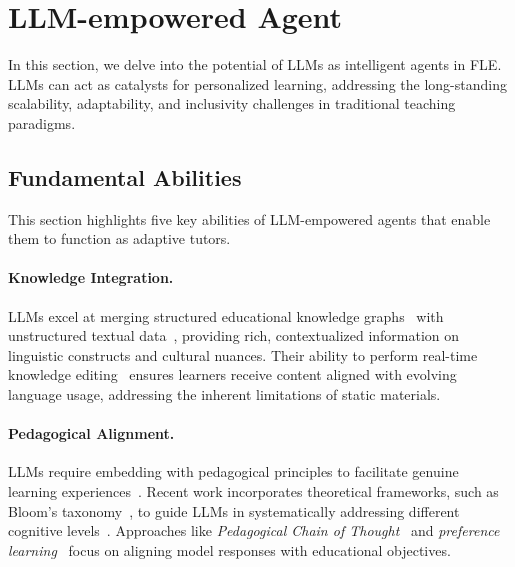 \section{LLM-empowered Agent}\label{sec:agent}
In this section, we delve into the potential of LLMs as intelligent agents in FLE. LLMs can act as catalysts for personalized learning, addressing the long-standing scalability, adaptability, and inclusivity challenges in traditional teaching paradigms.

\subsection{Fundamental Abilities}
This section highlights five key abilities of LLM-empowered agents that enable them to function as adaptive tutors.

\paragraph{Knowledge Integration.} LLMs excel at merging structured educational knowledge graphs~\cite{abu2024knowledge,hu2024foke} with unstructured textual data~\cite{li2024supporting,modran2024llm}, providing rich, contextualized information on linguistic constructs and cultural nuances. Their ability to perform real-time knowledge editing~\cite{wang2024knowledge,zhang2024comprehensive} ensures learners receive content aligned with evolving language usage, addressing the inherent limitations of static materials.

\paragraph{Pedagogical Alignment.} LLMs require embedding with pedagogical principles to facilitate genuine learning experiences~\cite{carroll1965contributions,taneja1995educational}. Recent work incorporates theoretical frameworks, such as Bloom’s taxonomy~\cite{bloom1956taxonomy}, to guide LLMs in systematically addressing different cognitive levels~\cite{jiang2024llms}. Approaches like \textit{Pedagogical Chain of Thought}~\cite{jiang2024llms} and \textit{preference learning}~\cite{sonkar-etal-2024-pedagogical,rafailov2024direct} focus on aligning model responses with educational objectives.

